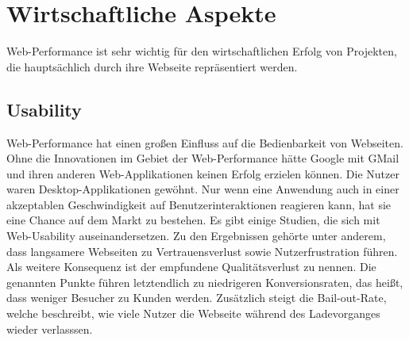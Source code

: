 
\section{Wirtschaftliche Aspekte}
Web-Performance ist sehr wichtig f\"ur den wirtschaftlichen Erfolg von Projekten, die haupts\"achlich durch ihre Webseite repr\"asentiert werden.
\subsection{Usability}
Web-Performance hat einen großen Einfluss auf die Bedienbarkeit von Webseiten. Ohne die Innovationen im Gebiet der Web-Performance hätte Google mit GMail und ihren anderen Web-Applikationen keinen Erfolg erzielen können. Die Nutzer waren Desktop-Applikationen gew\"ohnt. Nur wenn eine Anwendung auch in einer akzeptablen Geschwindigkeit auf Benutzerinteraktionen reagieren kann, hat sie eine Chance auf dem Markt zu bestehen. Es gibt einige Studien, die sich mit Web-Usability auseinandersetzen. Zu den Ergebnissen gehörte unter anderem, dass langsamere Webseiten zu Vertrauensverlust sowie Nutzerfrustration führen. Als weitere Konsequenz ist der empfundene Qualitätsverlust zu nennen. Die genannten Punkte führen letztendlich zu niedrigeren Konversionsraten, das heißt, dass weniger Besucher zu Kunden werden. Zus\"atzlich steigt die Bail-out-Rate, welche beschreibt, wie viele Nutzer die Webseite w\"ahrend des Ladevorganges wieder verlasssen.\citep{Toll2011}

